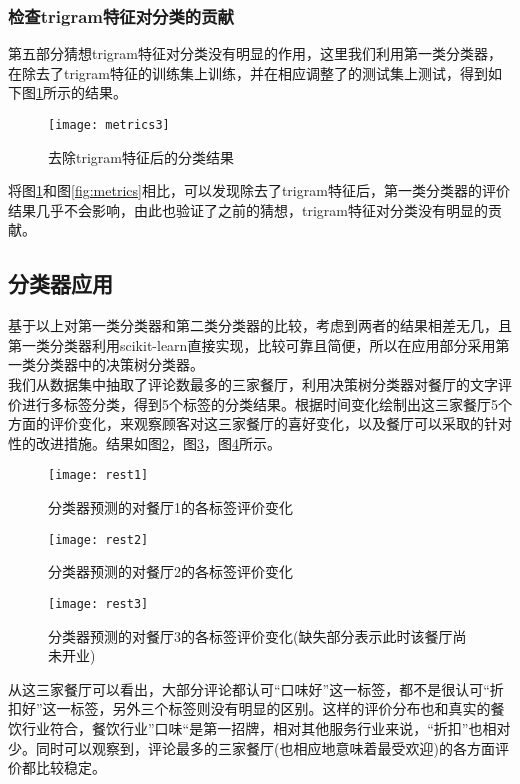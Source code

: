\documentclass[a4paper, twocolumn]{article}
\begin{document}
\begin{CJK}{UTF8}{gbsn}
	\subsubsection{检查trigram特征对分类的贡献}
	第五部分猜想trigram特征对分类没有明显的作用，这里我们利用第一类分类器，在除去了trigram特征的训练集上训练，并在相应调整了的测试集上测试，得到如下图\ref{fig:metrics3}所示的结果。
	\begin{figure}[h]
	\centering
	\texttt{[image: metrics3]}
	\caption{去除trigram特征后的分类结果}
	\label{fig:metrics3}
	\end{figure}
	\newline
	将图\ref{fig:metrics3}和图\ref{fig:metrics}相比，可以发现除去了trigram特征后，第一类分类器的评价结果几乎不会影响，由此也验证了之前的猜想，trigram特征对分类没有明显的贡献。
	\subsection{分类器应用}
	基于以上对第一类分类器和第二类分类器的比较，考虑到两者的结果相差无几，且第一类分类器利用scikit-learn直接实现，比较可靠且简便，所以在应用部分采用第一类分类器中的决策树分类器。\\
	我们从数据集中抽取了评论数最多的三家餐厅，利用决策树分类器对餐厅的文字评价进行多标签分类，得到5个标签的分类结果。根据时间变化绘制出这三家餐厅5个方面的评价变化，来观察顾客对这三家餐厅的喜好变化，以及餐厅可以采取的针对性的改进措施。结果如图\ref{fig:rest1}，图\ref{fig:rest2}，图\ref{fig:rest3}所示。
	\begin{figure}[h]
	\centering
	\texttt{[image: rest1]}
	\caption{分类器预测的对餐厅1的各标签评价变化}
	\label{fig:rest1}
	\end{figure}
	\begin{figure}[h]
	\centering
	\texttt{[image: rest2]}
	\caption{分类器预测的对餐厅2的各标签评价变化}
	\label{fig:rest2}
	\end{figure}
	\begin{figure}[h]
	\centering
	\texttt{[image: rest3]}
	\caption{分类器预测的对餐厅3的各标签评价变化(缺失部分表示此时该餐厅尚未开业)}
	\label{fig:rest3}
	\end{figure}
	\newline
	从这三家餐厅可以看出，大部分评论都认可“口味好”这一标签，都不是很认可“折扣好”这一标签，另外三个标签则没有明显的区别。这样的评价分布也和真实的餐饮行业符合，餐饮行业”口味“是第一招牌，相对其他服务行业来说，“折扣”也相对少。同时可以观察到，评论最多的三家餐厅(也相应地意味着最受欢迎)的各方面评价都比较稳定。
	

\end{CJK}
\end{document}
